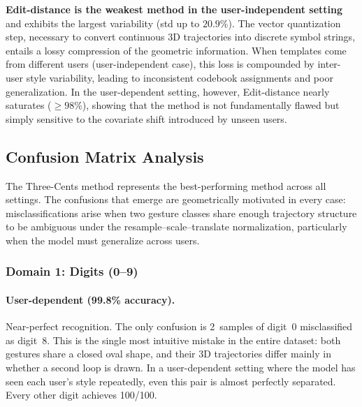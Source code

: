 \textbf{Edit-distance is the weakest method in the user-independent setting}
and exhibits the largest variability (std up to $20.9\%$). The vector
quantization step, necessary to convert continuous 3D trajectories into
discrete symbol strings, entails a lossy compression of the geometric
information. When templates come from different users (user-independent case),
this loss is compounded by inter-user style variability, leading to
inconsistent codebook assignments and poor generalization. In the
user-dependent setting, however, Edit-distance nearly saturates ($\geq 98\%$),
showing that the method is not fundamentally flawed but simply sensitive to
the covariate shift introduced by unseen users.

\subsection{Confusion Matrix Analysis}
\label{subsec:confusion}

The Three-Cents method represents the best-performing method across all settings. The confusions that emerge are geometrically motivated in every case: misclassifications arise when two gesture classes share enough trajectory structure to be ambiguous under the resample--scale--translate normalization, particularly when the model must generalize across users.

\subsubsection{Domain 1: Digits (0--9)}

\paragraph{User-dependent (99.8\% accuracy).}
Near-perfect recognition. The only confusion is 2~samples of digit~0 misclassified as digit~8. This is the single most intuitive mistake in the entire dataset: both gestures share a closed oval shape, and their 3D trajectories differ mainly in whether a second loop is drawn. In a user-dependent setting where the model has seen each user's style repeatedly, even this pair is almost perfectly separated. Every other digit achieves 100/100.

